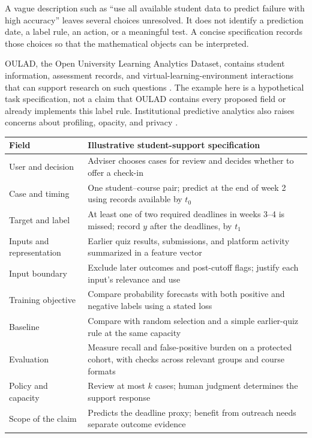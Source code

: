 A vague description such as ``use all available student data to predict failure with high accuracy'' leaves several choices unresolved. It does not identify a prediction date, a label rule, an action, or a meaningful test. A concise specification records those choices so that the mathematical objects can be interpreted.

OULAD, the Open University Learning Analytics Dataset, contains student information, assessment records, and virtual-learning-environment interactions that can support research on such questions \citep{kuzilek2017}. The example here is a hypothetical task specification, not a claim that OULAD contains every proposed field or already implements this label rule. Institutional predictive analytics also raises concerns about profiling, opacity, and privacy \citep{newamerica2016}.

\par\addvspace{\intextsep}\noindent\begin{minipage}{\linewidth}
\centering
\small
\setlength{\tabcolsep}{4pt}
\begin{tabular}{L{3.15cm}L{7.08cm}}
\toprule
Field & Illustrative student-support specification \\
\midrule
User and decision & Adviser chooses cases for review and decides whether to offer a check-in \\
Case and timing & One student--course pair; predict at the end of week 2 using records available by $t_0$ \\
Target and label & At least one of two required deadlines in weeks 3--4 is missed; record $y$ after the deadlines, by $t_1$ \\
Inputs and representation & Earlier quiz results, submissions, and platform activity summarized in a feature vector \\
Input boundary & Exclude later outcomes and post-cutoff flags; justify each input's relevance and use \\
Training objective & Compare probability forecasts with both positive and negative labels using a stated loss \\
Baseline & Compare with random selection and a simple earlier-quiz rule at the same capacity \\
Evaluation & Measure recall and false-positive burden on a protected cohort, with checks across relevant groups and course formats \\
Policy and capacity & Review at most $k$ cases; human judgment determines the support response \\
Scope of the claim & Predicts the deadline proxy; benefit from outreach needs separate outcome evidence \\
\bottomrule
\end{tabular}
\label{tab:framing-memo}
\end{minipage}\par\addvspace{\intextsep}

